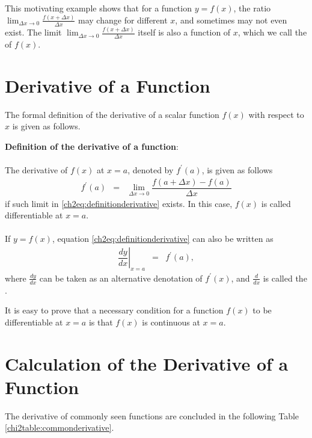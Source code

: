 This motivating example shows that for a function $y=f(x)$, the ratio $\lim_{\Delta x \rightarrow 0}\frac{f(x + \Delta x)}{\Delta x}$ may change for different $x$, and sometimes may not even exist. The limit  $\lim_{\Delta x \rightarrow 0}\frac{f(x + \Delta x)}{\Delta x}$ itself is also a function of $x$, which we call the  of $f(x)$.

\section{Derivative of a Function}

The formal definition of the derivative of a scalar function $f(x)$ with respect to $x$ is given as follows.

\begin{VF}
\textbf{Definition of the derivative of a function}:
\\
\\
\noindent The derivative of $f(x)$ at $x=a$, denoted by $f^\prime(a)$, is given as follows
\begin{eqnarray}
  f^\prime(a) &=& \lim_{\Delta x \rightarrow 0}\dfrac{f\left(a + \Delta x\right)-f(a)}{\Delta x} \label{ch2eq:definitionderivative}
\end{eqnarray}
if such limit in \eqref{ch2eq:definitionderivative} exists. In this case, $f(x)$ is called differentiable at $x=a$.
\\
\\
If $y=f(x)$, equation \eqref{ch2eq:definitionderivative} can also be written as
\begin{eqnarray}
  \left.\dfrac{dy}{dx}\right|_{x=a} &=& f^\prime(a), \nonumber
\end{eqnarray}
where $\frac{dy}{dx}$ can be taken as an alternative denotation of $f^\prime(x)$, and $\frac{d}{dx}$ is called the .
\end{VF}

It is easy to prove that a necessary condition for a function $f(x)$ to be differentiable at $x=a$ is that $f(x)$ is continuous at $x=a$.

\section{Calculation of the Derivative of a Function}

The derivative of commonly seen functions are concluded in the following Table \ref{chi2table:commonderivative}.

